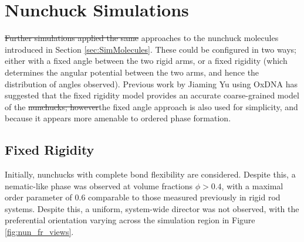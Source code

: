 \documentclass[11pt, a4paper]{article} %
\providecommand{\DIFadd}[1]{{\protect\color{blue}\uwave{#1}}} %
\providecommand{\DIFdel}[1]{{\protect\color{red}\sout{#1}}}                      %
\providecommand{\DIFaddbegin}{} %
\providecommand{\DIFaddend}{} %
\providecommand{\DIFdelbegin}{} %
\providecommand{\DIFdelend}{} %
\begin{document}
\section{Nunchuck Simulations} \label{sec:Nunchuck_Sim}
\DIFdelbegin \DIFdel{Further simulations applied the same }\DIFdelend \DIFaddbegin \DIFadd{\textcolor{forestgreen}{Further, I applied applied the same simulation }}\DIFaddend approaches to the nunchuck molecules introduced in Section \ref{sec:SimMolecules}. These could be configured in two ways; either with a fixed angle between the two rigid arms, or a fixed rigidity (which determines the angular potential between the two arms, and hence the distribution of angles observed). Previous work by Jiaming Yu using OxDNA \cite{OxDNA} has suggested that the fixed rigidity model provides an accurate coarse-grained model of the \DIFdelbegin \DIFdel{nunchucks; however}\DIFdelend \DIFaddbegin \DIFadd{DNA-nunchucks; however, }\DIFaddend the fixed angle approach is also used for simplicity, and because it appears more amenable to ordered phase formation.



\subsection{Fixed Rigidity}

Initially, nunchucks with complete bond flexibility are considered. Despite this, a nematic-like phase was observed at volume fractions $\phi > 0.4$, with a maximal order parameter of \num{0.6} comparable to those measured previously in rigid rod systems. Despite this, a uniform, system-wide director was not observed, with the preferential orientation varying across the simulation region \DIFaddbegin \DIFadd{\textcolor{forestgreen}{shown} }\DIFaddend in Figure \ref{fig:nun_fr_views}.
\end{document}
